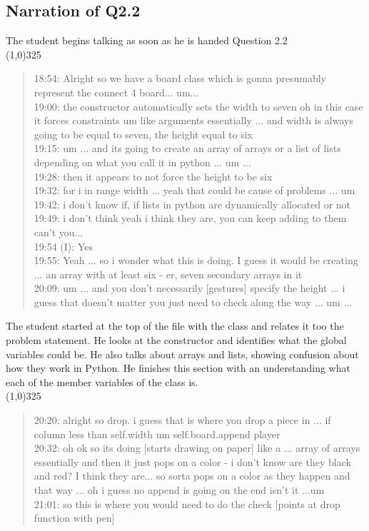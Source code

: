 \documentclass{article}
\begin{document}
\subsection{Narration of Q2.2}
The student begins talking as soon as he is handed Question 2.2 \\
\line(1,0){325}
\begin{quote}
18:54: Alright so we have a board class which is gonna presumably represent the connect 4 board... um...  \\
19:00: the constructor automatically sets the width to seven oh in this case it forces constraints um like arguments essentially ... and width is always going to be equal to seven, the height equal to six  \\
19:15: um ... and its going to create an array of arrays or a list of lists depending on what you call it in python ... um ...  \\
19:28: then it appears to not force the height to be six   \\
19:32: for i in range width ... yeah that could be cause of problems ... um  \\
19:42: i don't know if, if lists in python are dynamically allocated or not  \\
19:49: i don't think yeah i think they are, you can keep adding to them can't you...  \\
19:54 (I): Yes  \\
19:55: Yeah ... so i wonder what this is doing. I guess it would be creating ... an array with at least  six - er, seven secondary arrays in it  \\
20:09: um ... and you don't necessarily [gestures] specify the height ... i guess that doesn't matter you just need to check along the way ... um ...   \\
\end{quote}

The student started at the top of the file with the class and relates it too the problem statement. He looks at the constructor and identifies what the global variables could be. He also talks about arrays and lists, showing confusion about how they work in Python. He finishes this section with an understanding what each of the member variables of the class is. \\
\line(1,0){325}
\begin{quote}
20:20: alright so drop. i guess that is where you drop a piece in ... if column less than self.width um self.board.append player \\
20:32: oh ok so its doing  [starts drawing on paper] like a ... array of arrays essentially and then it just pops on a color - i don't know are they black and red? I think they are... so sorta pops on a color as they happen and that way  ... oh i guess no append is going on the end isn't it ...um  \\
21:01: so this is where you would need to do the check [points at drop function with pen] \\
\end{quote}
\end{document}
